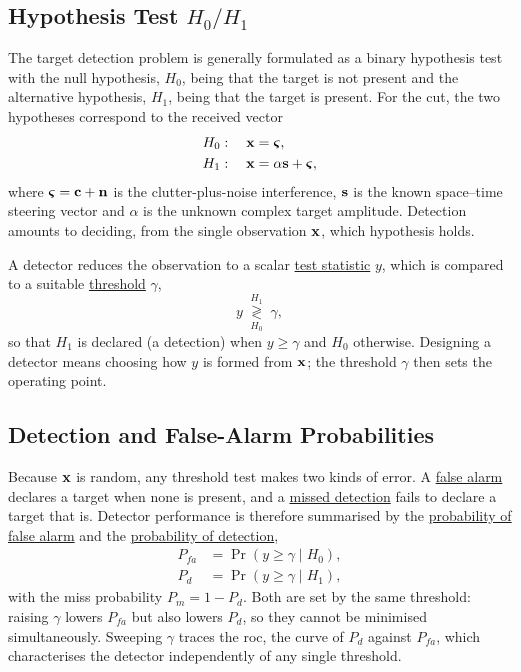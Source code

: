 \documentclass{article}
\begin{document}
\subsection{Hypothesis Test $H_0/H_1$}
The target detection problem is generally formulated as a binary hypothesis test with the null hypothesis, $H_0$, being that the target is not present and the alternative hypothesis, $H_1$, being that the target is present. For the \gls{cut}, the two hypotheses correspond to the received vector
\begin{align}
    H_0&:\quad \vb x = \boldsymbol{\varsigma}, \nonumber\\
    H_1&:\quad \vb x = \alpha\vb s + \boldsymbol{\varsigma}, \nonumber
\end{align}
where $\boldsymbol{\varsigma} = \vb c + \vb n$ is the clutter-plus-noise interference, $\vb s$ is the known space--time steering vector and $\alpha$ is the unknown complex target amplitude. Detection amounts to deciding, from the single observation $\vb x$, which hypothesis holds.

A detector reduces the observation to a scalar \underline{test statistic} $y$, which is compared to a suitable \underline{threshold} $\gamma$, $$y \;\underset{H_0}{\overset{H_1}{\gtrless}}\; \gamma,$$ so that $H_1$ is declared (a detection) when $y\ge\gamma$ and $H_0$ otherwise. Designing a detector means choosing how $y$ is formed from $\vb x$; the threshold $\gamma$ then sets the operating point.

\subsection{Detection and False-Alarm Probabilities}
Because $\vb x$ is random, any threshold test makes two kinds of error. A \underline{false alarm} declares a target when none is present, and a \underline{missed detection} fails to declare a target that is. Detector performance is therefore summarised by the \underline{probability of false alarm} and the \underline{probability of detection},
\begin{align}
    P_{fa} &= \Pr(y\ge\gamma \mid H_0), \nonumber\\
    P_{d}  &= \Pr(y\ge\gamma \mid H_1), \nonumber
\end{align}
with the miss probability $P_m = 1-P_d$. Both are set by the same threshold: raising $\gamma$ lowers $P_{fa}$ but also lowers $P_d$, so they cannot be minimised simultaneously. Sweeping $\gamma$ traces the \gls{roc}, the curve of $P_d$ against $P_{fa}$, which characterises the detector independently of any single threshold.
\end{document}
